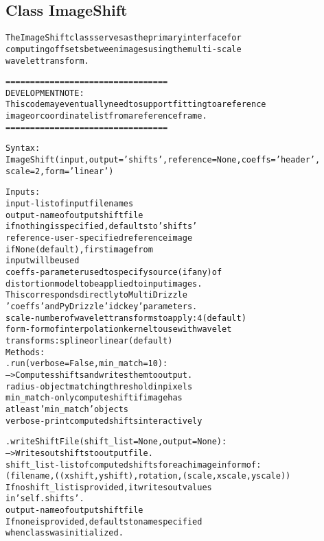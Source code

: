 

\subsection{Class ImageShift}

    \label{multireg:imageshift:ImageShift}
\begin{alltt}
The ImageShift class serves as the primary interface for
computing offsets between images using the multi-scale
wavelet transform. 

=================================
DEVELOPMENT NOTE:  
This code may eventually need to support fitting to a reference
image or coordinate list from a reference frame.
=================================

Syntax:
    ImageShift(input,output='shifts',reference=None, coeffs='header',
               scale=2,form='linear')
                
Inputs:
    input       - list of input filenames
    output      - name of output shiftfile
                    if nothing is specified, defaults to 'shifts'
    reference   - user-specified reference image
                    if None (default), first image from 
                    input will be used
    coeffs      - parameter used to specify source (if any) of 
                    distortion model to be applied to input images.
                    This corresponds directly to MultiDrizzle
                    'coeffs' and PyDrizzle 'idckey' parameters.
    scale       - number of wavelet transforms to apply: 4 (default)
    form        - form of interpolation kernel to use with wavelet
                    transforms: spline or linear (default)
Methods:
    .run(verbose=False,min\_match=10):
        --{\textgreater} Computes shifts and writes them to output.
        radius  - object matching threshold in pixels
        min\_match   - only compute shift if image has 
                        at least 'min\_match' objects 
        verbose - print computed shifts interactively

    .writeShiftFile(shift\_list = None, output=None):
        --{\textgreater} Writes out shifts to output file.
        shift\_list  - list of computed shifts for each image in form of:
                (filename,((xshift,yshift),rotation,(scale,xscale,yscale))
                    If no shift\_list is provided, it writes out values
                    in 'self.shifts'.
        output      - name of output shift file
                    If none is provided, defaults to name specified
                    when class was initialized.\end{alltt}


